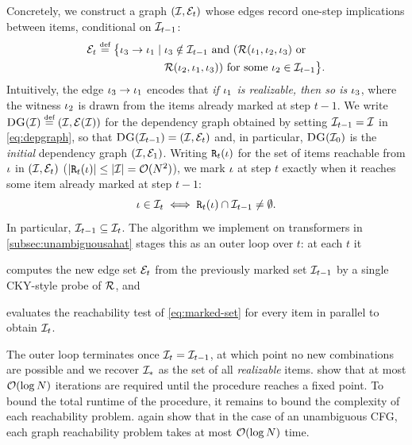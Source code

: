 \documentclass{article}
\begin{document}
Concretely, we construct a graph $({{\mathcal{I}}}, {\mathcal{E}}_t)$ whose edges record one-step implications between items, conditional on ${{\mathcal{I}}}_{t-1}$:
\begin{align}\label{eq:depgraph}
    \edges_t \defeq \bigl\{\itm_3 \to \itm_1 \mid \; & \itm_3 \notin \items_{t-1} \text{ and } (\sR(\itm_1, \itm_2, \itm_3) \text{ or } \\ & \sR(\itm_2, \itm_1, \itm_3)) \text{ for some } \itm_2 \in \items_{t-1}\bigr\}. \notag
\end{align}
Intuitively, the edge ${{ \iota}}_3 \to {{ \iota}}_1$ encodes that \emph{if ${{ \iota}}_1$ is realizable, then so is ${{ \iota}}_3$}, where the witness ${{ \iota}}_2$ is drawn from the items already marked at step $t-1$.
We write $\depgraph(\sI) \defeq (\items, \edges(\sI))$ for the dependency graph obtained by setting ${{\mathcal{I}}}_{t-1} = {{{ \mathcal{I}}}}$ in \cref{eq:depgraph}, so that ${\textsc{DG}}({{\mathcal{I}}}_{t-1}) = ({{\mathcal{I}}}, {\mathcal{E}}_t)$ and, in particular, ${\textsc{DG}}({{\mathcal{I}}}_0)$ is the \emph{initial} dependency graph $({{\mathcal{I}}}, {\mathcal{E}}_1)$.
Writing ${\mathtt{R}}_t({{ \iota}})$ for the set of items reachable from ${{ \iota}}$ in $({{\mathcal{I}}}, {\mathcal{E}}_t)$ ($|{\mathtt{R}}_t({{ \iota}})| \le |{{\mathcal{I}}}| = {{ \mathcal{O}}}({{ N}}^2)$), we mark ${{ \iota}}$ at step $t$ exactly when it reaches some item already marked at step $t-1$:
\begin{equation}\label{eq:marked-set}
    {{ \iota}} \in {{\mathcal{I}}}_t \iff {\mathtt{R}}_t({{ \iota}}) \cap {{\mathcal{I}}}_{t-1} \neq \emptyset.
\end{equation}
In particular, ${{\mathcal{I}}}_{t-1} \subseteq {{\mathcal{I}}}_t$.
The algorithm we implement on transformers in \cref{subsec:unambiguousahat} stages this as an outer loop over $t$: at each $t$ it 
\begin{enumerate*}[label=\textit{(\roman*)}]
    \item computes the new edge set ${\mathcal{E}}_t$ from the previously marked set ${{\mathcal{I}}}_{t-1}$ by a single CKY-style probe of ${{{ \mathcal{R}}}}$, and
    \item evaluates the reachability test of \cref{eq:marked-set} for every item in parallel to obtain ${{\mathcal{I}}}_t$.
\end{enumerate*}
The outer loop terminates once ${{\mathcal{I}}}_t = {{\mathcal{I}}}_{t-1}$, at which point no new combinations are possible and we recover ${{\mathcal{I}}}_*$ as the set of all \emph{realizable} items.
\citet{chytil-unambiguous} show that at most ${{ \mathcal{O}}}(\log {{ N}})$ iterations are required until the procedure reaches a fixed point. 
To bound the total runtime of the procedure, it remains to bound the complexity of each reachability problem.
\citet{chytil-unambiguous} again show that in the case of an unambiguous CFG, each graph reachability problem takes at most ${{ \mathcal{O}}}(\log {{ N}})$ time.
\end{document}
